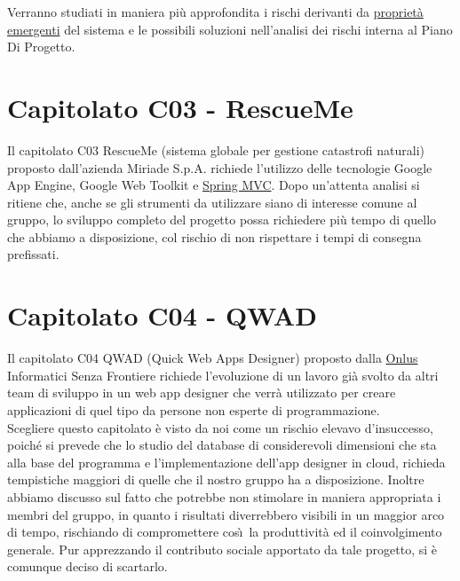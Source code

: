 Verranno studiati in maniera pi\`u approfondita i rischi derivanti da
\underline{propriet\`a emergenti} del sistema e le possibili soluzioni
nell'analisi dei rischi interna al Piano Di Progetto.

\chapter{Capitolato C03 - RescueMe}
\thispagestyle{fancy}
Il capitolato C03 RescueMe (sistema globale per gestione catastrofi naturali)
proposto dall'azienda Miriade S.p.A. richiede l'utilizzo delle tecnologie
Google App Engine, Google Web Toolkit e \underline{Spring MVC}. Dopo un'attenta
analisi si ritiene che, anche se gli strumenti da utilizzare siano di
interesse comune al gruppo, lo sviluppo completo del progetto possa richiedere
pi\`u tempo di quello che abbiamo a disposizione, col rischio di non rispettare
i tempi di consegna prefissati.

\chapter{Capitolato C04 - QWAD}
\thispagestyle{fancy}
Il capitolato C04 QWAD (Quick Web Apps Designer) proposto dalla \underline{Onlus}
Informatici Senza Frontiere richiede l'evoluzione di un lavoro gi\`a
svolto da altri team di sviluppo in un web app designer che
verr\`a utilizzato per creare applicazioni di quel tipo da persone non esperte
di programmazione.\\

Scegliere questo capitolato \`e visto da noi come un rischio elevavo
d'insuccesso, poich\'e si prevede che lo studio del database di considerevoli
dimensioni che sta alla base del programma e l'implementazione dell'app
designer in cloud, richieda tempistiche maggiori di quelle che il
nostro gruppo ha a disposizione. Inoltre abbiamo discusso sul fatto
che potrebbe non stimolare in maniera appropriata i membri del gruppo, in quanto
i risultati diverrebbero visibili in un maggior arco di tempo, rischiando di
compromettere cos\`\i\ la produttivit\`a ed il coinvolgimento generale. Pur
apprezzando il contributo sociale apportato da tale progetto, si \`e comunque
deciso di scartarlo.

